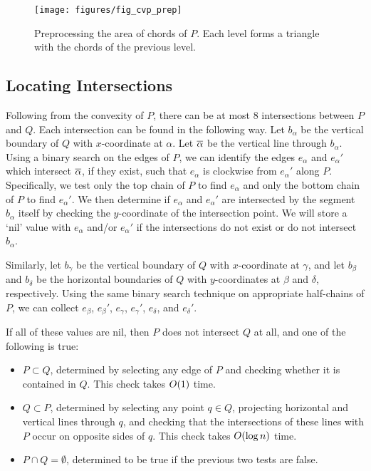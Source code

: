 \begin{figure}[t]
\begin{center}
  \texttt{[image: figures/fig\_cvp\_prep]}
  \caption[Preprocessing the area of chords of $P$.]{Preprocessing the area of chords of $P$.  Each level forms a triangle with the chords of the previous level.}
  \label{fig:convexp:preprocessing}
\end{center}
\end{figure}


\subsection{Locating Intersections}
\label{:convexp:intersections}

Following from the convexity of $P$, there can be at most $8$ intersections between $P$ and $Q$.
Each intersection can be found in the following way. 
Let $b_\alpha$ be the vertical boundary of $Q$ with $x$-coordinate at $\alpha$. 
Let $\overline{\alpha}$ be the vertical line through $b_\alpha$. 
Using a binary search on the edges of $P$, we can identify the edges $e_\alpha$ and $e_\alpha'$ which intersect $\overline{\alpha}$, if they exist, such that $e_\alpha$ is clockwise from $e_\alpha'$ along $P$.
Specifically, we test only the top chain of $P$ to find $e_\alpha$ and only the bottom chain of $P$ to find $e_\alpha'$.
We then determine if $e_\alpha$ and $e_\alpha'$ are intersected by the segment $b_\alpha$ itself by checking the $y$-coordinate of the intersection point. 
We will store a `nil' value with $e_\alpha$ and/or $e_\alpha'$ if the intersections do not exist or do not intersect $b_\alpha$.

Similarly, let $b_\gamma$ be the vertical boundary of $Q$ with $x$-coordinate at $\gamma$, and let $b_\beta$ and $b_\delta$ be the horizontal boundaries of $Q$ with $y$-coordinates at $\beta$ and $\delta$, respectively.  Using the same binary search technique on appropriate half-chains of $P$, we can collect $e_\beta$, $e_\beta'$, $e_\gamma$, $e_\gamma'$, $e_\delta$, and $e_\delta'$.  

If all of these values are nil, then $P$ does not intersect $Q$ at all, and one of the following is true:

\begin{itemize}
 \item $P \subset Q$, determined by selecting any edge of $P$ and checking whether it is contained in $Q$. This check takes $O\!\left(1\right)$ time.

 \item $Q \subset P$, determined by selecting any point $q \in Q$, projecting horizontal and vertical lines through $q$, and checking that the intersections of these lines with $P$ occur on opposite sides of $q$. This check takes $O\!\left(\log{n}\right)$ time.

 \item $P \cap Q = \emptyset$, determined to be true if the previous two tests are false.
\end{itemize}


